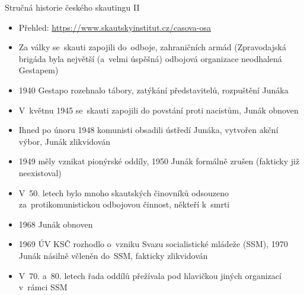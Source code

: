 \documentclass[compress, ucs, xelatex, 11pt, xcolor=dvipsnames, print, aspectratio=169,
	hyperref={
		bookmarks=true,
		unicode=true,
		colorlinks=true,
		pdftitle={Skautska vychovna metoda},
		plainpages=false,
		pdfauthor={Vojtech Zeisek},
		pdfsubject={Skautska vychovna metoda a jeji vyvoj za posledni stoleti a desetileti},
		pdfcreator={XeLaTeX},
		pdfkeywords={Junak, Pedagogika, Skaut, Skauting, Vychovna metoda},
		linkcolor=Red, %
		anchorcolor=ForestGreen, %
		citecolor=ForestGreen, %
		filecolor=ForestGreen, %
		menucolor=ForestGreen, %
		urlcolor=Sepia, %
		pdftex},
	url={hyphens, lowtilde} %
	]{beamer}
\begin{document}
\begin{frame}{Stručná historie českého skautingu II}
	\begin{itemize}
		\item Přehled: \url{https://www.skautskyinstitut.cz/casova-osa}
		\item Za války se~skauti zapojili do~odboje, zahraničních armád (Zpravodajská brigáda byla největší (a~velmi úspěšná) odbojová organizace neodhalená Gestapem)
		\item 1940 Gestapo rozehnalo tábory, zatýkání představitelů, rozpuštění Junáka
		\item V~květnu 1945 se~skauti zapojili do povstání proti nacistům, Junák obnoven
		\item Ihned po únoru 1948 komunisti obsadili ústředí Junáka, vytvořen akční výbor, Junák zlikvidován
		\item 1949 měly vznikat pionýrské oddíly, 1950 Junák formálně zrušen (fakticky již neexistoval)
		\item V~50. letech bylo mnoho skautských činovníků odsouzeno za~protikomunistickou odbojovou činnost, někteří k~smrti
		\item 1968 Junák obnoven
		\item 1969 ÚV KSČ rozhodlo o~vzniku Svazu socialistické mládeže (SSM), 1970 Junák násilně včleněn do~SSM, fakticky zlikvidován
		\item V~70. a~80. letech řada oddílů přežívala pod hlavičkou jiných organizací v~rámci SSM
	\end{itemize}
\end{frame}
\end{document}
